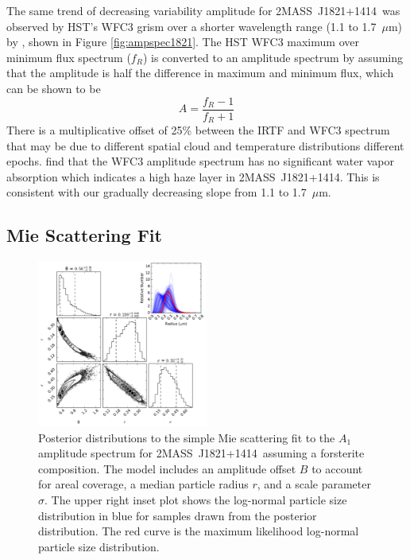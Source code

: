 \documentclass[twocolumn]{aastex6}
\newcommand{\shb}{2MASS~J1821+1414}
\begin{document}
The same trend of decreasing variability amplitude for \shb\ was observed by HST's WFC3 grism over a shorter wavelength range (1.1 to 1.7~$\mu$m) by \citet{2015ApJ...798L..13Y}, shown in Figure \ref{fig:ampspec1821}.
The HST WFC3 maximum over minimum flux spectrum ($f_R$) is converted to an amplitude spectrum by assuming that the amplitude is half the difference in maximum and minimum flux, which can be shown to be 
\begin{equation}\label{eq:ampFromRatio}
A  = \frac{f_R - 1}{f_R + 1}
\end{equation}
There is a multiplicative offset of 25\% between the IRTF and WFC3 spectrum that may be due to different spatial cloud and temperature distributions  different epochs.
\citet{2015ApJ...798L..13Y} find that the WFC3 amplitude spectrum has no significant water vapor absorption which indicates a high haze layer in {\shb}. This is consistent with our gradually decreasing slope from 1.1 to 1.7~$\mu$m.

\subsection{Mie Scattering Fit}

\begin{figure}
\begin{centering}
\includegraphics[width=0.5\textwidth]{corner_j1821_mie_sc.pdf}
\caption{Posterior distributions to the simple Mie scattering fit to the $A_1$ amplitude spectrum for \shb\ assuming a forsterite composition.
The model includes an amplitude offset $B$ to account for areal coverage, a median particle radius $r$, and a scale parameter $\sigma$.
The upper right inset plot shows the log-normal particle size distribution in blue for samples drawn from the posterior distribution.
The red curve is the maximum likelihood log-normal particle size distribution.}\label{fig:corner1821mie}
\end{centering}
\end{figure}
\end{document}
